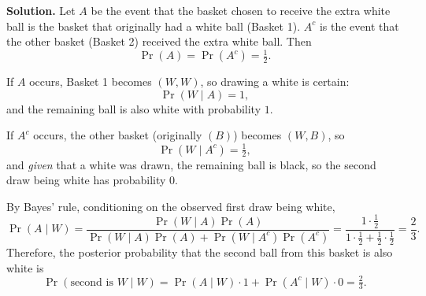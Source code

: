\documentclass{article}
\begin{document}
\textbf{Solution.}
Let $A$ be the event that the basket chosen to receive the extra white ball is the basket that originally had a white ball (Basket 1). $A^c$ is the event that the other basket (Basket 2) received the extra white ball. Then
\[
\Pr(A)=\Pr(A^c)=\tfrac12.
\]

If $A$ occurs, Basket 1 becomes $(W,W)$, so drawing a white is certain:
\[
\Pr(W\mid A)=1,
\]
and the remaining ball is also white with probability $1$.

If $A^c$ occurs, the other basket (originally $(B)$) becomes $(W,B)$, so
\[
\Pr(W\mid A^c)=\tfrac12,
\]
and \emph{given} that a white was drawn, the remaining ball is black, so the second draw being white has probability $0$.

By Bayes' rule, conditioning on the observed first draw being white,
\[
\Pr(A\mid W)=\frac{\Pr(W\mid A)\Pr(A)}{\Pr(W\mid A)\Pr(A)+\Pr(W\mid A^c)\Pr(A^c)}
=\frac{1\cdot \tfrac12}{1\cdot \tfrac12+\tfrac12\cdot \tfrac12}
=\frac{2}{3}.
\]
Therefore, the posterior probability that the second ball from this basket is also white is
\[
\Pr(\text{second is } W \mid W)=\Pr(A\mid W)\cdot 1+\Pr(A^c\mid W)\cdot 0=\tfrac{2}{3}.
\]
\end{document}
